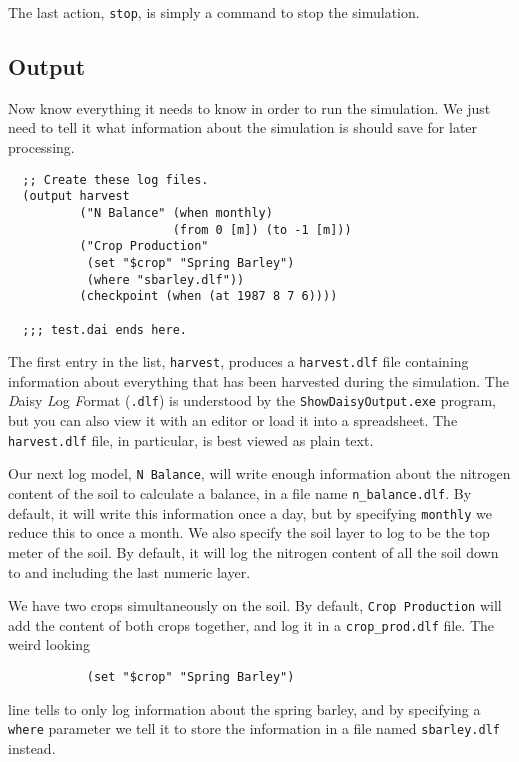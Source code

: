 \documentclass[a4paper,11pt]{article}
\begin{document}
The last action, \texttt{stop}, is simply a command to stop the
simulation.

\subsection{Output}
\label{ex:output}

Now \daisy{} know everything it needs to know in order to run the
simulation.  We just need to tell it what information about the
simulation is should save for later processing.

\begin{verbatim}
  ;; Create these log files.
  (output harvest
          ("N Balance" (when monthly)
                       (from 0 [m]) (to -1 [m]))
          ("Crop Production"
           (set "$crop" "Spring Barley")
           (where "sbarley.dlf"))
          (checkpoint (when (at 1987 8 7 6))))

  ;;; test.dai ends here.
\end{verbatim}

The first entry in the list, \texttt{harvest}, produces a
\texttt{harvest.dlf} file containing information about everything that
has been harvested during the simulation.  The \emph{D}aisy \emph{L}og
\emph{F}ormat (\texttt{.dlf}) is understood by the
\texttt{ShowDaisyOutput.exe} program, but you can also view it with an
editor or load it into a spreadsheet.  The \texttt{harvest.dlf} file,
in particular, is best viewed as plain text.

Our next log model, \texttt{N~Balance}, will write enough information
about the nitrogen content of the soil to calculate a balance, in a
file name \texttt{n\_balance.dlf}.  By default, it will write this
information once a day, but by specifying \texttt{monthly} we reduce
this to once a month.  We also specify the soil layer to log to be the
top meter of the soil.  By default, it will log the nitrogen content
of all the soil down to and including the last numeric layer.

We have two crops simultaneously on the soil.  By default,
\texttt{Crop~Production} will add the content of both crops together,
and log it in a \texttt{crop\_prod.dlf} file.  The weird looking

\begin{verbatim}
           (set "$crop" "Spring Barley")
\end{verbatim}%

line tells \daisy{} to only log information about the spring barley,
and by specifying a \texttt{where} parameter we tell it to store the
information in a file named \texttt{sbarley.dlf} instead.
\end{document}
